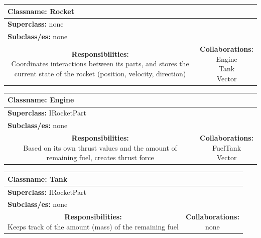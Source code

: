 \documentclass{article}
\begin{document}
\begin {center}

\begin{tabular}{|c|c|}
\hline
\multicolumn{2}{|l|}{\textbf{Classname:} Rocket}\\
\hline
\multicolumn{2}{|l|}{\textbf{Superclass:} none}\\
\multicolumn{2}{|l|}{\textbf{Subclass/es:} none}\\
\hline
\parbox[]{5cm}{\vspace{3px}\textbf{Responsibilities:} \\Coordinates interactions between its parts, and stores the current state of the rocket (position, velocity, direction)\vspace{3px}} & \parbox[]{5cm}{\textbf{Collaborations:}\\Engine\\Tank\\Vector}\\
\hline
 \end{tabular}\vspace{.4cm}
 
\begin{tabular}{|c|c|}
\hline
\multicolumn{2}{|l|}{\textbf{Classname:} Engine}\\
\hline
\multicolumn{2}{|l|}{\textbf{Superclass:} IRocketPart}\\
\multicolumn{2}{|l|}{\textbf{Subclass/es:} none}\\
\hline
\parbox[]{5cm}{\vspace{3px}\textbf{Responsibilities:} \\Based on its own thrust values and the amount of remaining fuel, creates thrust force\vspace{3px}} & \parbox[]{5cm}{\textbf{Collaborations:}\\FuelTank\\Vector}\\
\hline
 \end{tabular}\vspace{.4cm}

\begin{tabular}{|c|c|}
\hline
\multicolumn{2}{|l|}{\textbf{Classname:} Tank}\\
\hline
\multicolumn{2}{|l|}{\textbf{Superclass:} IRocketPart}\\
\multicolumn{2}{|l|}{\textbf{Subclass/es:} none}\\
\hline
\parbox[]{5cm}{\vspace{3px}\textbf{Responsibilities:} \\Keeps track of the amount (mass) of the remaining fuel\vspace{3px}} & \parbox[]{5cm}{\textbf{Collaborations:}\\none}\\
\hline
 \end{tabular}\vspace{.4cm}


\end{center}
\end{document}
